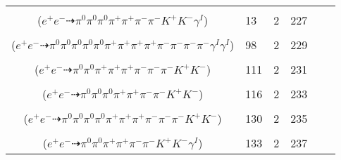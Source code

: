 \documentclass[landscape]{article}
\newcounter{rownumbers}
\newcommand\rn{\stepcounter{rownumbers}\arabic{rownumbers}}
\newcommand{\EOL}{\\} %
\newcommand{\topoTags}[1]{#1} %
\begin{document}
\begin{longtable}{clcccc}
\rn & \makecell[l]{ $ 
e^{+} e^{-} \rightarrow \pi^{0} \pi^{0} \pi^{+} \pi^{+} \pi^{-} \rho^{-} K^{+} K^{-} \gamma^{I} ,
\rho^{-} \rightarrow \pi^{0} \pi^{-} 
$ \\ ($
e^{+} e^{-} \dashrightarrow \pi^{0} \pi^{0} \pi^{0} \pi^{+} \pi^{+} \pi^{-} \pi^{-} K^{+} K^{-} \gamma^{I} 
$) } & \topoTags{13 & }2 & 227 \EOL

\rn & \makecell[l]{ $ 
e^{+} e^{-} \rightarrow \pi^{0} \pi^{0} \pi^{0} \pi^{+} \pi^{+} \pi^{-} \pi^{-} \omega \omega \gamma^{I} \gamma^{I} ,
\omega \rightarrow \pi^{0} \pi^{+} \pi^{-} ,
\omega \rightarrow \pi^{0} \pi^{+} \pi^{-} 
$ \\ ($
e^{+} e^{-} \dashrightarrow \pi^{0} \pi^{0} \pi^{0} \pi^{0} \pi^{0} \pi^{+} \pi^{+} \pi^{+} \pi^{+} \pi^{-} \pi^{-} \pi^{-} \pi^{-} \gamma^{I} \gamma^{I} 
$) } & \topoTags{98 & }2 & 229 \EOL

\rn & \makecell[l]{ $ 
e^{+} e^{-} \rightarrow \pi^{0} \pi^{0} \rho^{0} \pi^{+} \pi^{-} K^{*} \bar{K}^{*} ,
\rho^{0} \rightarrow \pi^{+} \pi^{-} ,
K^{*} \rightarrow \pi^{-} K^{+} ,
\bar{K}^{*} \rightarrow \pi^{+} K^{-} 
$ \\ ($
e^{+} e^{-} \dashrightarrow \pi^{0} \pi^{0} \pi^{+} \pi^{+} \pi^{+} \pi^{-} \pi^{-} \pi^{-} K^{+} K^{-} 
$) } & \topoTags{111 & }2 & 231 \EOL

\rn & \makecell[l]{ $ 
e^{+} e^{-} \rightarrow \pi^{0} \pi^{0} \rho^{0} \pi^{+} \pi^{-} K^{-} K^{*+} ,
\rho^{0} \rightarrow \pi^{+} \pi^{-} ,
K^{*+} \rightarrow \pi^{0} K^{+} 
$ \\ ($
e^{+} e^{-} \dashrightarrow \pi^{0} \pi^{0} \pi^{0} \pi^{+} \pi^{+} \pi^{-} \pi^{-} K^{+} K^{-} 
$) } & \topoTags{116 & }2 & 233 \EOL

\rn & \makecell[l]{ $ 
e^{+} e^{-} \rightarrow \pi^{0} \pi^{0} \pi^{0} \pi^{+} \pi^{+} \pi^{-} \pi^{-} \omega K^{+} K^{-} ,
\omega \rightarrow \pi^{0} \pi^{+} \pi^{-} 
$ \\ ($
e^{+} e^{-} \dashrightarrow \pi^{0} \pi^{0} \pi^{0} \pi^{0} \pi^{+} \pi^{+} \pi^{+} \pi^{-} \pi^{-} \pi^{-} K^{+} K^{-} 
$) } & \topoTags{130 & }2 & 235 \EOL

\rn & \makecell[l]{ $ 
e^{+} e^{-} \rightarrow \pi^{0} \pi^{+} \pi^{+} \pi^{-} \rho^{-} K^{+} K^{-} \gamma^{I} ,
\rho^{-} \rightarrow \pi^{0} \pi^{-} 
$ \\ ($
e^{+} e^{-} \dashrightarrow \pi^{0} \pi^{0} \pi^{+} \pi^{+} \pi^{-} \pi^{-} K^{+} K^{-} \gamma^{I} 
$) } & \topoTags{133 & }2 & 237 \EOL


\end{longtable}
\end{document}
